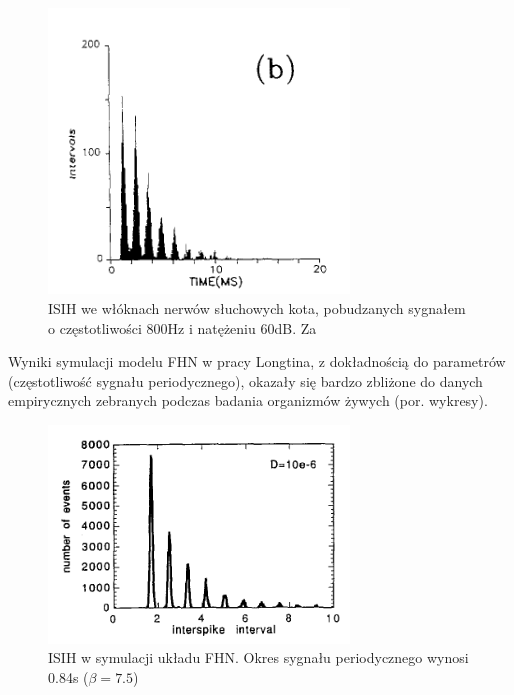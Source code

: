   \begin{figure}
    \includegraphics[width=80mm]{images/longtin_fig1b.png}
    \caption{ISIH we włóknach nerwów słuchowych kota, pobudzanych sygnałem o częstotliwości 800Hz i natężeniu 60dB. Za \cite{longtin}}
  \end{figure}

  Wyniki symulacji modelu FHN w pracy Longtina, z dokładnością do parametrów (częstotliwość sygnału periodycznego), okazały się bardzo zbliżone do danych empirycznych zebranych podczas badania organizmów żywych (por. wykresy).

  \begin{figure}
    \includegraphics[width=80mm]{images/longtin_fig5a.png}
    \caption{ISIH w symulacji układu FHN. Okres sygnału periodycznego wynosi 0.84s ($\beta = 7.5$)}
  \end{figure}  




